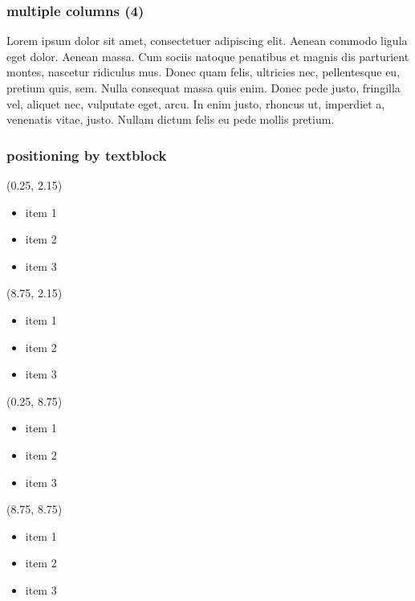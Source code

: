 \begin{frame}
\frametitle{multiple columns (4)}
\setlength\columnsep{30pt}
\begin{multicols}{4}
\justifying
Lorem ipsum dolor sit amet, consectetuer adipiscing elit. Aenean commodo ligula eget dolor. Aenean massa. Cum sociis natoque penatibus et magnis dis parturient montes, nascetur ridiculus mus. Donec quam felis, ultricies nec, pellentesque eu, pretium quis, sem. Nulla consequat massa quis enim. Donec pede justo, fringilla vel, aliquet nec, vulputate eget, arcu. In enim justo, rhoncus ut, imperdiet a, venenatis vitae, justo. Nullam dictum felis eu pede mollis pretium.
\end{multicols}
\end{frame}

\begin{frame}
\frametitle{positioning by textblock}
\vspace{-7 cm}
\begin{textblock}{8}(0.25, 2.15) %
\begin{itemize}
\item item 1
\item item 2
\item item 3
\end{itemize}
\end{textblock}
\begin{textblock}{8}(8.75, 2.15) %
\begin{itemize}
\item item 1
\item item 2
\item item 3
\end{itemize}
\end{textblock}
\begin{textblock}{8}(0.25, 8.75) %
\begin{itemize}
\item item 1
\item item 2
\item item 3
\end{itemize}
\end{textblock}
\begin{textblock}{8}(8.75, 8.75) %
\begin{itemize}
\item item 1
\item item 2
\item item 3
\end{itemize}
\end{textblock}
\end{frame}

